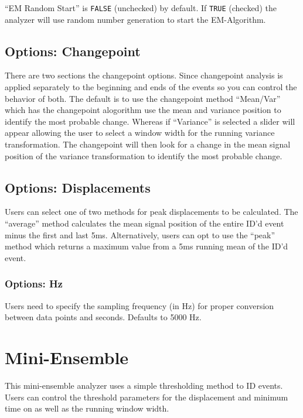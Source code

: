 \documentclass[
]{book}
\begin{document}
``EM Random Start'' is \texttt{FALSE} (unchecked) by default. If \texttt{TRUE} (checked) the analyzer will use random number generation to start the EM-Algorithm.

\subsection{Options: Changepoint}\label{options-changepoint}

There are two sections the changepoint options. Since changepoint analysis is applied separately to the beginning and ends of the events so you can control the behavior of both. The default is to use the changepoint method ``Mean/Var'' which has the changepoint alogorithm use the mean and variance position to identify the most probable change. Whereas if ``Variance'' is selected a slider will appear allowing the user to select a window width for the running variance transformation. The changepoint will then look for a change in the mean signal position of the variance transformation to identify the most probable change.

\subsection{Options: Displacements}\label{options-displacements}

Users can select one of two methods for peak displacements to be calculated. The ``average'' method calculates the mean signal position of the entire ID'd event minus the first and last 5ms. Alternatively, users can opt to use the ``peak'' method which returns a maximum value from a 5ms running mean of the ID'd event.

\subsubsection{Options: Hz}\label{options-hz}

Users need to specify the sampling frequency (in Hz) for proper conversion between data points and seconds. Defaults to 5000 Hz.

\section{Mini-Ensemble}\label{mini-ensemble}

This mini-ensemble analyzer uses a simple thresholding method to ID events. Users can control the threshold parameters for the displacement and minimum time on as well as the running window width.
\end{document}
